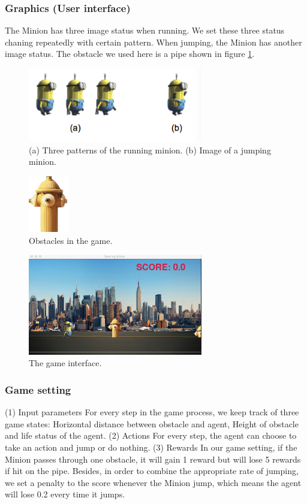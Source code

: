 \documentclass{acmsiggraph}
\begin{document}
\subsubsection{Graphics (User interface)}
The Minion has three image status when running. We set these three status chaning repeatedly with certain pattern. When jumping, the Minion has another image status. The obstacle we used here is a pipe shown in figure \ref{fig:minion}.


\begin{figure}[ht]
  \centering
  \includegraphics[width=3.0in]{../fig/minion.png}
  \caption{(a) Three patterns of the running minion. (b) Image of a jumping minion.}
  \label{fig:minion}
\end{figure}


\begin{figure}[ht]
  \centering
  \includegraphics[width=50pt]{../fig/obstacle.png}
  \caption{Obstacles in the game.}
  \label{fig:obstacle}
\end{figure}


\begin{figure}[ht]
  \centering
  \includegraphics[width=3.0in]{../fig/interface.jpg}
  \caption{The game interface.}
  \label{fig:interface}
\end{figure}

\subsubsection{Game setting}
(1) Input parameters
For every step in the game process, we keep track of three game states: Horizontal distance between obstacle and agent, Height of obstacle and life status of the agent.
(2) Actions
For every step, the agent can choose to take an action and jump or do nothing.
(3) Rewards
In our game setting, if the Minion passes through one obstacle, it will gain 1 reward but will lose 5 rewards if hit on the pipe. Besides, in order to combine the appropriate rate of jumping, we set a penalty to the score whenever the Minion jump, which means the agent will lose 0.2 every time it jumps. 
\end{document}
